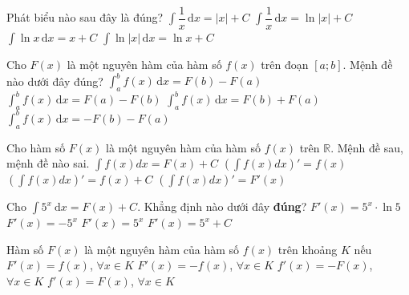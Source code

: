 \begin{ex}%
	Phát biểu nào sau đây là đúng? 
	\choice 
		{$\displaystyle\int \dfrac{1}{x} \mathrm{\,d}x  =|x|+ C$}
		{\True $\displaystyle\int \dfrac{1}{x} \mathrm{\,d}x =  \ln |x|+C$}
		{$\displaystyle\int \ln{x} \mathrm{\,d}x  =x+ C$}
		{$\displaystyle\int \ln {|x|} \mathrm{\,d}x = \ln{x}+  C$}
\end{ex}

\begin{ex}%
	Cho $F\left(x\right)$ là một  nguyên hàm của hàm số $f\left(x\right)$ trên đoạn $\left[a;b\right]$. Mệnh đề nào dưới đây đúng?
	\choice 
		{\True $\displaystyle\int_{a}^{b}f\left(x\right)\,\mathrm{d}x=F\left(b\right)-F\left(a\right)$} 
		 {$\displaystyle\int_{a}^{b}f\left(x\right)\,\mathrm{d}x=F\left(a\right)-F\left(b\right)$}
		{$\displaystyle\int_{a}^{b}f\left(x\right)\,\mathrm{d}x=F\left(b\right)+F\left(a\right)$} 
		{$\displaystyle\int_{a}^{b}  f\left(x\right)\,\mathrm{d}x=-F\left(b\right)-F\left(a\right)$}
\end{ex}

\begin{ex}%
	Cho hàm số $F(x)$ là một nguyên hàm của hàm số  $f(x)$ trên $\mathbb{R}$. Mệnh đề sau, mệnh đề nào sai.
	 \choice
		{$\displaystyle\int f(x)dx = F(x)+C$} 
		{$\left(\displaystyle\int f(x)dx\right)'  = f(x)$}
		{\True $\left(\displaystyle\int f(x)dx\right)'  = f(x)+C$}
		{$\left(\displaystyle\int f(x)dx\right)' =  F'(x)$}
\end{ex}

\begin{ex}%
	Cho $\displaystyle\int5^{x} \mathrm{~d} x=F(x)+C$. Khẳng định nào dưới đây \textbf{đúng}? 
	\choice 
		{$F'(x)=5^x\cdot\ln  5$}
		 {$F'(x)=-5^x$}
		{\True $F'(x)=5^x$} 
		{$F'(x)=5^x+C$} 
\end{ex}

\begin{ex}%
	Hàm số  $F(x)$ là một nguyên hàm của hàm số $f(x)$ trên khoảng $K$ nếu
	\choice 
		{\True $F'(x)=f(x)$, $\forall x \in  K$}
		{$F'(x)=-f(x)$,  $\forall x \in K$}
		{$f'(x)=-F(x)$, $\forall  x \in K$}
		 {$f'(x)=F(x)$, $\forall x \in K$}
\end{ex}


